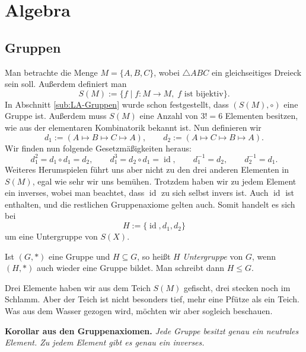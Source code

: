 \documentclass[a4paper,11pt,fleqn,twoside]{scrartcl}
\numberwithin{equation}{section}
\newcommand{\id}{\operatorname{id}}
\newcommand{\strong}[1]{{\normalfont\sffamily\bfseries #1}}
\newenvironment{Definition}{\par\noindent\strong{Definition.}}{\par}
\begin{document}
\section{Algebra}
\subsection{Gruppen}
Man betrachte die Menge $M=\{A,B,C\}$, wobei $\triangle ABC$ ein
gleichseitiges Dreieck sein soll. Außerdem definiert man
\begin{equation}
S(M) := \{f\mid f\colon M\to M,\;\text{$f$ ist bijektiv}\}.
\end{equation}
In Abschnitt \ref{sub:LA-Gruppen} wurde schon festgestellt,
dass $(S(M),\circ)$ eine Gruppe ist. Außerdem muss $S(M)$ eine
Anzahl von $3!=6$ Elementen besitzen, wie aus der elementaren
Kombinatorik bekannt ist. Nun definieren wir
\begin{equation}
d_1 := (A \mapsto B \mapsto C\mapsto A),\qquad d_2:=(A\mapsto C\mapsto B\mapsto A).
\end{equation}
Wir finden nun folgende Gesetzmäßigkeiten heraus:
\begin{equation}
d_1^2 = d_1\circ d_1 = d_2, \qquad d_1^3 = d_2\circ d_1 = \id, \qquad d_1^{-1}=d_2,\qquad d_2^{-1}=d_1.
\end{equation}
Weiteres Herumspielen führt uns aber nicht zu den drei anderen
Elementen in $S(M)$, egal wie sehr wir uns bemühen. Trotzdem
haben wir zu jedem Element ein inverses, wobei man beachtet,
dass $\id$ zu sich selbst invers ist. Auch $\id$ ist enthalten,
und die restlichen Gruppenaxiome gelten auch. Somit handelt es sich
bei
\begin{equation}\label{eq:Drehungen}
H := \{\id,d_1,d_2\}
\end{equation}
um eine Untergruppe von $S(X)$.

\begin{Definition}
Ist $(G,*)$ eine Gruppe und $H\subseteq G$, so heißt $H$
\emph{Untergruppe} von $G$, wenn $(H,*)$ auch wieder eine Gruppe
bildet. Man schreibt dann $H\le G$.
\end{Definition}
Drei Elemente haben wir aus dem Teich $S(M)$ gefischt, drei
stecken noch im Schlamm. Aber der Teich ist nicht besonders tief,
mehr eine Pfütze als ein Teich. Was aus dem Wasser gezogen wird,
möchten wir aber sogleich beschauen.

\strong{Korollar aus den Gruppenaxiomen.} \emph{Jede Gruppe
besitzt genau ein neutrales Element. Zu jedem Element gibt
es genau ein inverses.}
\end{document}
